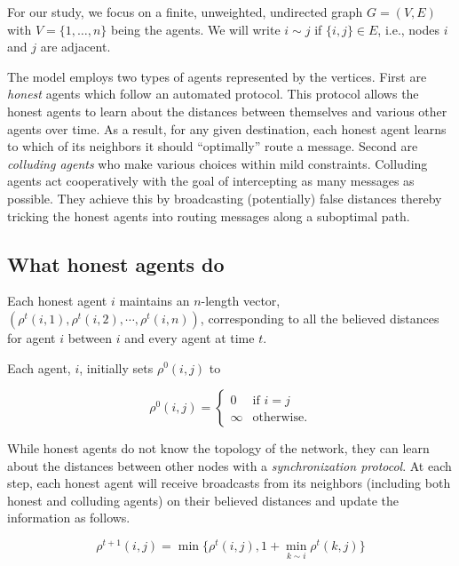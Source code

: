 \documentclass{comnet}
\begin{document}
For our study, we focus on a finite, unweighted, undirected graph $G = (V,E)$
with $V = \{1, \dots, n\}$ being the agents. We will write $i \sim j$ if
$\{i,j\} \in E$, i.e., nodes $i$ and $j$ are adjacent.

The model employs two types of agents represented by the vertices. First are
{\it honest} agents which follow an automated protocol. This protocol allows
the honest agents to learn about the distances between themselves and various
other agents over time. As a result, for any given destination, each honest
agent learns to which of its neighbors it should ``optimally'' route a message.
Second are {\it colluding agents} who make various choices within mild
constraints. Colluding agents act cooperatively with the goal of intercepting
as many messages as possible. They achieve this by broadcasting (potentially)
false distances thereby tricking the honest agents into routing messages along
a suboptimal path.

\subsection{What honest agents do} \label{sec:synchronization}

Each honest agent $i$ maintains an $n$-length vector, $(\rho^t(i,1),
\rho^t(i,2),\cdots,\rho^t(i,n))$, corresponding to all the believed distances
for agent $i$ between $i$ and every agent at time $t$.

Each agent, $i$, initially sets $\rho^0(i,j)$ to

\begin{equation} \label{uniformrho}
   \rho^0(i,j) =
    \begin{cases}
        0 & \text{if } i = j \\
        \infty & \text{otherwise.}
    \end{cases}
\end{equation}
 
While honest agents do not know the topology of the network, they can learn
about the distances between other nodes with a {\it synchronization protocol}.
At each step, each honest agent will receive broadcasts from its neighbors
(including both honest and colluding agents) on their believed distances and
update the information as follows.

\begin{equation}
   \rho^{t+1}(i,j) = \min \{ \rho^{t}(i,j), 1 + \min_{k \sim i} \rho^{t}(k,j) \} \label{uniformd}
\end{equation}
\end{document}
